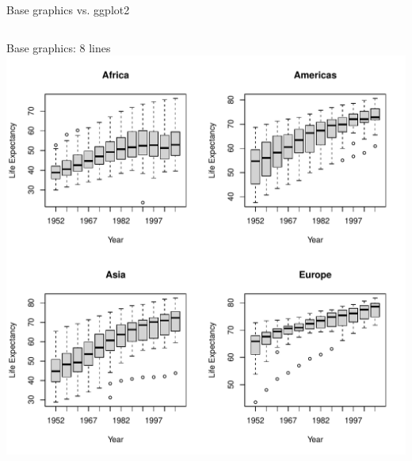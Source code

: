 \documentclass[aspectratio=169]{beamer}\usepackage[]{graphicx}\usepackage[]{color}
\makeatletter
\def\maxwidth{ %
  \ifdim\Gin@nat@width>\linewidth
    \linewidth
  \else
    \Gin@nat@width
  \fi
}
\newenvironment{knitrout}{}{} %
\makeatother
\begin{document}
\begin{frame}[fragile]{Base graphics vs. ggplot2}
\begin{columns}
  \begin{column}{0.50\textwidth}
  Base graphics: 8 lines
\begin{knitrout}\scriptsize
{}\color{fgcolor}
\includegraphics[width=\maxwidth]{figure/unnamed-chunk-1-1} 


\end{knitrout}
\end{column}
\end{columns}
\end{frame}
\end{document}
